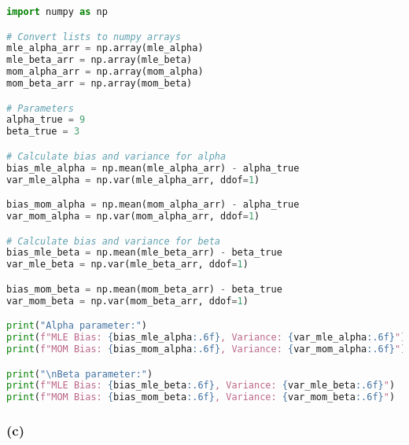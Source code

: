 \begin{lstlisting}[language=Python]
import numpy as np

# Convert lists to numpy arrays
mle_alpha_arr = np.array(mle_alpha)
mle_beta_arr = np.array(mle_beta)
mom_alpha_arr = np.array(mom_alpha)
mom_beta_arr = np.array(mom_beta)

# Parameters
alpha_true = 9
beta_true = 3

# Calculate bias and variance for alpha
bias_mle_alpha = np.mean(mle_alpha_arr) - alpha_true
var_mle_alpha = np.var(mle_alpha_arr, ddof=1)

bias_mom_alpha = np.mean(mom_alpha_arr) - alpha_true
var_mom_alpha = np.var(mom_alpha_arr, ddof=1)

# Calculate bias and variance for beta
bias_mle_beta = np.mean(mle_beta_arr) - beta_true
var_mle_beta = np.var(mle_beta_arr, ddof=1)

bias_mom_beta = np.mean(mom_beta_arr) - beta_true
var_mom_beta = np.var(mom_beta_arr, ddof=1)

print("Alpha parameter:")
print(f"MLE Bias: {bias_mle_alpha:.6f}, Variance: {var_mle_alpha:.6f}")
print(f"MOM Bias: {bias_mom_alpha:.6f}, Variance: {var_mom_alpha:.6f}")

print("\nBeta parameter:")
print(f"MLE Bias: {bias_mle_beta:.6f}, Variance: {var_mle_beta:.6f}")
print(f"MOM Bias: {bias_mom_beta:.6f}, Variance: {var_mom_beta:.6f}")
\end{lstlisting}



\subsubsection*{(c)}

